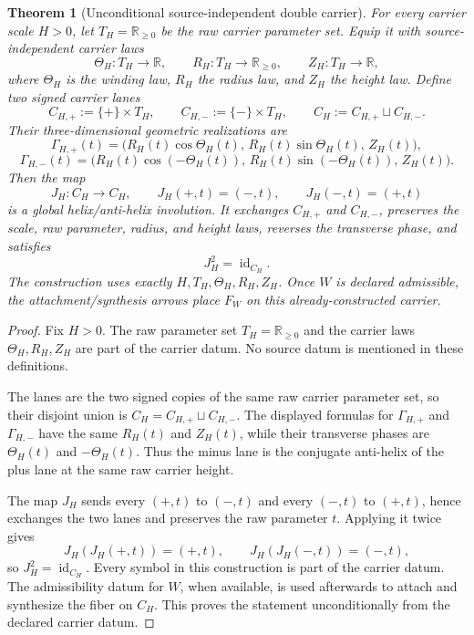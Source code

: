 \documentclass[11pt]{article}
\newtheorem{theorem}{Theorem}
\theoremstyle{definition}
\begin{document}
\begin{theorem}[Unconditional source-independent double carrier]\label{thm:g1-double-carrier}
For every carrier scale \(H>0\), let \(T_H=\mathbb R_{\ge0}\) be the raw
carrier parameter set.  Equip it with source-independent carrier laws
\[
\Theta_H:T_H\to\mathbb R,\qquad
R_H:T_H\to\mathbb R_{\ge0},\qquad
Z_H:T_H\to\mathbb R,
\]
where \(\Theta_H\) is the winding law, \(R_H\) the radius law, and \(Z_H\)
the height law.  Define two signed carrier lanes
\[
C_{H,+}:=\{+\}\times T_H,
\qquad
C_{H,-}:=\{-\}\times T_H,
\qquad
C_H:=C_{H,+}\sqcup C_{H,-}.
\]
Their three-dimensional geometric realizations are
\[
\Gamma_{H,+}(t)
=
\bigl(R_H(t)\cos\Theta_H(t),\,R_H(t)\sin\Theta_H(t),\,Z_H(t)\bigr),
\]
\[
\Gamma_{H,-}(t)
=
\bigl(R_H(t)\cos(-\Theta_H(t)),\,R_H(t)\sin(-\Theta_H(t)),\,Z_H(t)\bigr).
\]
Then the map
\[
J_H:C_H\to C_H,\qquad
J_H(+,t)=(-,t),\qquad J_H(-,t)=(+,t)
\]
is a global helix/anti-helix involution.  It exchanges \(C_{H,+}\) and
\(C_{H,-}\), preserves the scale, raw parameter, radius, and height laws,
reverses the transverse phase, and satisfies
\[
J_H^2=\operatorname{id}_{C_H}.
\]
The construction uses exactly \(H,T_H,\Theta_H,R_H,Z_H\).  Once \(W\) is
declared admissible, the attachment/synthesis arrows place \(F_W\) on this
already-constructed carrier.
\end{theorem}

\begin{proof}
Fix \(H>0\).  The raw parameter set \(T_H=\mathbb R_{\ge0}\) and the carrier
laws \(\Theta_H,R_H,Z_H\) are part of the carrier datum.  No source datum is
mentioned in these definitions.

The lanes are the two signed copies of the same raw carrier parameter set, so
their disjoint union is \(C_H=C_{H,+}\sqcup C_{H,-}\).  The displayed formulas
for \(\Gamma_{H,+}\) and \(\Gamma_{H,-}\) have the same \(R_H(t)\) and
\(Z_H(t)\), while their transverse phases are \(\Theta_H(t)\) and
\(-\Theta_H(t)\).  Thus the minus lane is the conjugate anti-helix of the plus
lane at the same raw carrier height.

The map \(J_H\) sends every \((+,t)\) to \((-,t)\) and every \((-,t)\) to
\((+,t)\), hence exchanges the two lanes and preserves the raw parameter
\(t\).  Applying it twice gives
\[
J_H(J_H(+,t))=(+,t),
\qquad
J_H(J_H(-,t))=(-,t),
\]
so \(J_H^2=\operatorname{id}_{C_H}\).  Every symbol in this construction is
part of the carrier datum.  The admissibility datum for \(W\), when available,
is used afterwards to attach and synthesize the fiber on \(C_H\).  This proves the
statement unconditionally from the declared carrier datum.
\end{proof}
\end{document}
